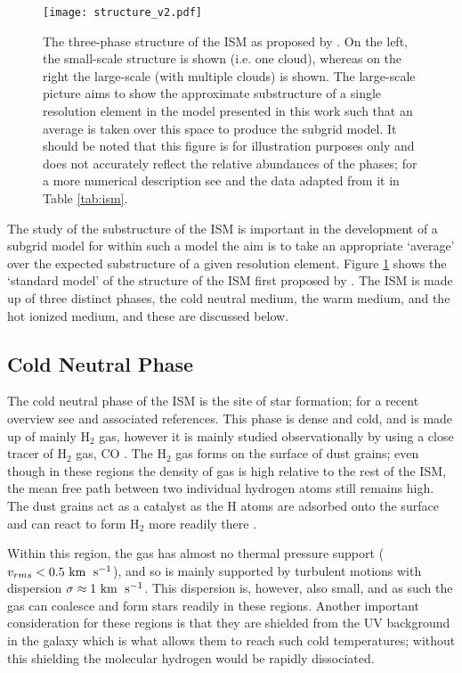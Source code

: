 \begin{figure}[ht]
    \centering

    \texttt{[image: structure\_v2.pdf]}

    \caption{The three-phase structure of the ISM as proposed by \citet{mckee_theory_1977}.
        On the left, the small-scale structure is shown (i.e. one cloud), whereas on the right the large-scale (with multiple clouds) is shown.
        The large-scale picture aims to show the approximate substructure of a single resolution element in the model presented in this work such that an average is taken over this space to produce the subgrid model.
    It should be noted that this figure is for illustration purposes only and does not accurately reflect the relative abundances of the phases; for a more numerical description see \citet{ferriere_interstellar_2001} and the data adapted from it in Table \ref{tab:ism}.}
    \label{fig:struct}
\end{figure}

The study of the substructure of the ISM is important in the development of a subgrid model for within such a model the aim is to take an appropriate `average' over the expected substructure of a given resolution element.
Figure \ref{fig:struct} shows the `standard model' of the structure of the ISM first proposed by \citet{mckee_theory_1977}.
The ISM is made up of three distinct phases, the cold neutral medium, the warm medium, and the hot ionized medium, and these are discussed below.

\subsection{Cold Neutral Phase}

The cold neutral phase of the ISM is the site of star formation; for a recent overview see \citet{mckee_theory_2007} and associated references.
This phase is dense and cold, and is made up of mainly H$_2$ gas, however it is mainly studied observationally by using a close tracer of H$_2$ gas, CO \citep{ferriere_interstellar_2001}.
The H$_2$ gas forms on the surface of dust grains; even though in these regions the density of gas is high relative to the rest of the ISM, the mean free path between two individual hydrogen atoms still remains high.
The dust grains act as a catalyst as the H atoms are adsorbed onto the surface and can react to form H$_2$ more readily there \citep{gould_interstellar_1963}.

Within this region, the gas has almost no thermal pressure support ($v_{rms} < 0.5 ~\mathrm{km}\;~\mathrm{s}^{-1}$), and so is mainly supported by turbulent motions \citep{larson_turbulence_1981, solomon_mass_1987, heyer_universality_2004} with dispersion $\sigma \approx 1 ~\mathrm{km}\;~\mathrm{s}^{-1}$.
This dispersion is, however, also small, and as such the gas can coalesce and form stars readily in these regions.
Another important consideration for these regions is that they are shielded from the UV background in the galaxy which is what allows them to reach such cold temperatures; without this shielding the molecular hydrogen would be rapidly dissociated. 

